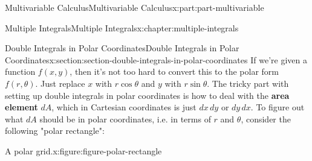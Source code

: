 \documentclass[twoside,10pt,]{book}
\newcommand{\terminology}[1]{\textbf{#1}}
\numberwithin{equation}{part}
\begin{document}
\begin{partptx}{Multivariable Calculus}{}{Multivariable Calculus}{}{}{x:part:part-multivariable}
\begin{chapterptx}{Multiple Integrals}{}{Multiple Integrals}{}{}{x:chapter:multiple-integrals}
\begin{sectionptx}{Double Integrals in Polar Coordinates}{}{Double Integrals in Polar Coordinates}{}{}{x:section:section-double-integrals-in-polar-coordinates}
If we're given a function \(f(x,y)\), then it's not too hard to convert this to the polar form \(f(r,\theta)\). Just replace \(x\) with \(r\cos\theta\) and \(y\) with \(r\sin\theta\). The tricky part with setting up double integrals in polar coordinates is how to deal with the \terminology{area element} \(dA\), which in Cartesian coordinates is just \(dx\,dy\) or \(dy\,dx\). To figure out what \(dA\) should be in polar coordinates, i.e. in terms of \(r\) and \(\theta\), consider the following "polar rectangle": \begin{figureptx}{A polar grid.}{x:figure:figure-polar-rectangle}{}%
\begin{image}{0}{1}{0}%
\end{image}
\end{figureptx}
\end{sectionptx}
\end{chapterptx}
\end{partptx}
\end{document}
